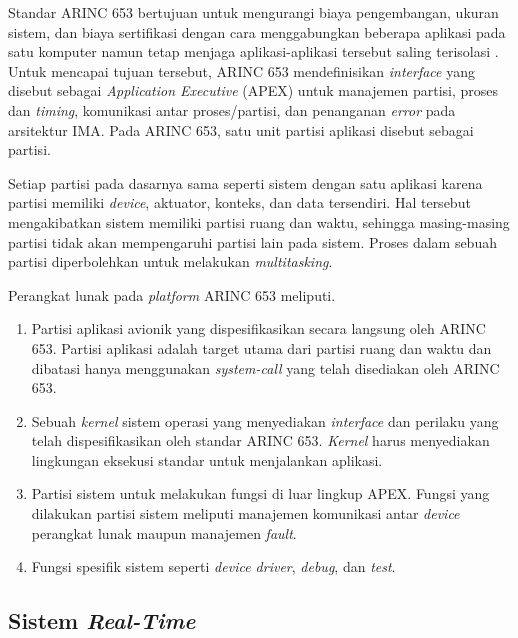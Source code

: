 Standar ARINC 653 bertujuan untuk mengurangi biaya pengembangan, ukuran sistem, dan biaya
sertifikasi dengan cara menggabungkan beberapa aplikasi pada satu komputer namun tetap menjaga
aplikasi-aplikasi tersebut saling terisolasi
\citep[pp.~3-30]{AirlinesElectronicEngineeringCommittee2012}.  Untuk mencapai tujuan tersebut,
ARINC 653 mendefinisikan \textit{interface} yang disebut sebagai \textit{Application Executive}
(APEX) untuk manajemen partisi, proses dan \textit{timing}, komunikasi antar proses/partisi, dan
penanganan \textit{error} pada arsitektur IMA.  Pada ARINC 653, satu unit partisi aplikasi
disebut sebagai partisi.

Setiap partisi pada dasarnya sama seperti sistem dengan satu aplikasi karena partisi memiliki
\textit{device}, aktuator, konteks, dan data tersendiri.  Hal tersebut mengakibatkan sistem
memiliki partisi ruang dan waktu, sehingga masing-masing partisi tidak akan mempengaruhi partisi
lain pada sistem.  Proses dalam sebuah partisi diperbolehkan untuk melakukan
\textit{multitasking}.

Perangkat lunak pada \textit{platform} ARINC 653 meliputi.

\begin{enumerate}

    \item Partisi aplikasi avionik yang dispesifikasikan secara langsung oleh ARINC 653. Partisi
    	    aplikasi adalah target utama dari partisi ruang dan waktu dan dibatasi hanya
    	    menggunakan \textit{system-call} yang telah disediakan oleh ARINC 653.

    \item Sebuah \textit{kernel} sistem operasi yang menyediakan \textit{interface} dan perilaku
    	    yang telah dispesifikasikan oleh standar ARINC 653. \textit{Kernel} harus
    	    menyediakan lingkungan eksekusi standar untuk menjalankan aplikasi.

    \item Partisi sistem untuk melakukan fungsi di luar lingkup APEX. Fungsi yang dilakukan
    	    partisi sistem meliputi manajemen komunikasi antar \textit{device} perangkat lunak
    	    maupun manajemen \textit{fault}.

    \item Fungsi spesifik sistem seperti \textit{device driver}, \textit{debug}, dan
    	    \textit{test}.

\end{enumerate}

\subsection{Sistem \textit{Real-Time}}
\label{section:sistem_realtime}

